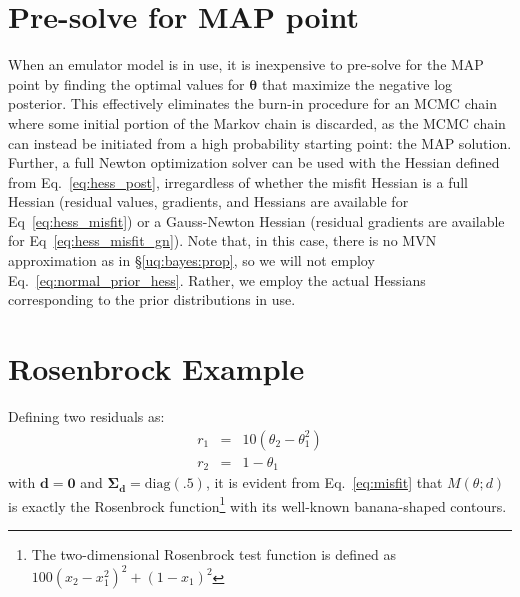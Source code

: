 \section{Pre-solve for MAP point} \label{uq:bayes:map}

When an emulator model is in use, it is inexpensive to pre-solve for
the MAP point by finding the optimal values for $\boldsymbol{\theta}$
that maximize the negative log posterior.  This effectively eliminates
the burn-in procedure for an MCMC chain where some initial portion of
the Markov chain is discarded, as the MCMC chain can instead be
initiated from a high probability starting point: the MAP solution.
Further, a full Newton optimization solver can be used with the
Hessian defined from Eq.~\ref{eq:hess_post}, irregardless of whether
the misfit Hessian is a full Hessian (residual values, gradients, and
Hessians are available for Eq~\ref{eq:hess_misfit}) or a Gauss-Newton
Hessian (residual gradients are available for
Eq~\ref{eq:hess_misfit_gn}).  Note that, in this case, there is no MVN
approximation as in \S\ref{uq:bayes:prop}, so we will not employ
Eq.~\ref{eq:normal_prior_hess}.  Rather, we employ the actual Hessians
corresponding to the prior distributions in use.


\section{Rosenbrock Example} \label{uq:bayes:ex}

Defining two residuals as:
\begin{eqnarray}
r_1 &=& 10 (\theta_2 - \theta_1^2) \label{eq:rosen_r1} \\
r_2 &=& 1 - \theta_1 \label{eq:rosen_r2}
\end{eqnarray}
with $\boldsymbol{d} = \boldsymbol{0}$ and $\boldsymbol{\Sigma_d} =
\text{diag}(\boldsymbol{.5})$, it is evident from Eq.~\ref{eq:misfit}
that $M(\theta;d)$ is exactly the Rosenbrock function\footnote{The
  two-dimensional Rosenbrock test function is defined as $100 (x_2 -
  x_1^2)^2 + (1 - x_1)^2$} with its well-known banana-shaped contours.

